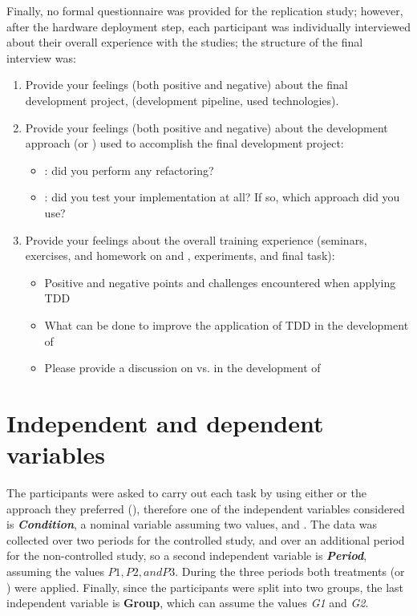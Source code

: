 \noindent Finally, no formal questionnaire was provided for the replication study; however, after the hardware deployment step, each participant was individually interviewed about their overall experience with the studies; the structure of the final interview was:
\begin{enumerate}
    \item Provide your feelings (both positive and negative) about the final development project, (\eg development pipeline, used technologies).
    \item Provide your feelings (both positive and negative) about the development approach (\ie \tdd or \notdd) used to accomplish the final development project:
        \begin{itemize}
            \item \tdd: did you perform any refactoring? 
            \item \notdd: did you test your implementation at all? If so, which approach did you use?
        \end{itemize}
    \item Provide your feelings about the overall training experience (seminars, exercises, and homework on \tdd and \notdd, experiments, and final task):
        \begin{itemize}
            \item Positive and negative points and challenges encountered when applying TDD
            \item What can be done to improve the application of TDD in the development of \ess
            \item Please provide a discussion on \tdd vs. \notdd in the development of \ess
        \end{itemize}
\end{enumerate}





\section{Independent and dependent variables}
The participants were asked to carry out each task by using either \tdd or the approach they preferred (\notdd), therefore one of the independent variables considered is \textbf{\textit{Condition}}, a nominal variable assuming two values, \tdd and \notdd. The data was collected over two periods for the controlled study, and over an additional period for the non-controlled study, so a second independent variable is \textbf{\textit{Period}}, assuming the values $P1, P2, and P3$. During the three periods both treatments (\tdd or \notdd) were applied. Finally, since the participants were split into two groups, the last independent variable is \textbf{Group}, which can assume the values \textit{G1} and \textit{G2}.


